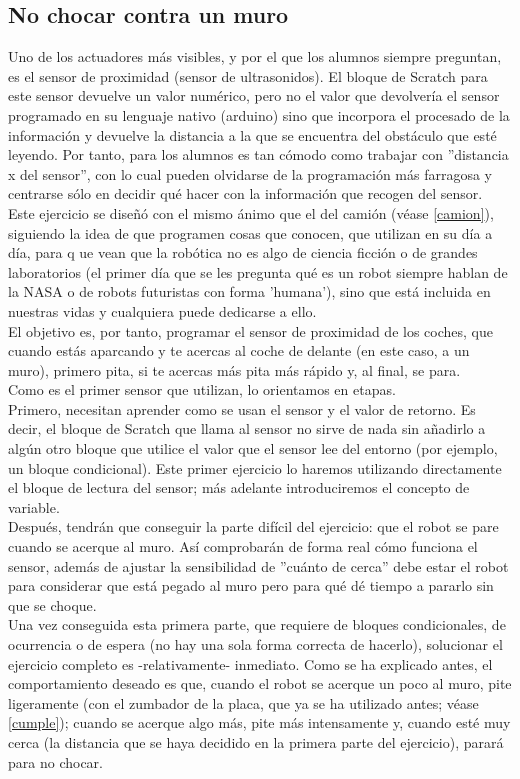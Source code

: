 \subsection{No chocar contra un muro}\label{muro}
Uno de los actuadores más visibles, y por el que los alumnos siempre preguntan, es el sensor de proximidad (sensor de ultrasonidos). El bloque de Scratch para este sensor devuelve un valor numérico, pero no el valor que devolvería el sensor programado en su lenguaje nativo (arduino) sino que incorpora el procesado de la información y devuelve la distancia a la que se encuentra del obstáculo que esté leyendo. Por tanto, para los alumnos es tan cómodo como trabajar con ''distancia x del sensor'', con lo cual pueden olvidarse de la programación más farragosa y centrarse sólo en decidir qué hacer con la información que recogen del sensor. \\
Este ejercicio se diseñó con el mismo ánimo que el del camión (véase \ref{camion}), siguiendo la idea de que programen cosas que conocen, que utilizan en su día a día, para q	ue vean que la robótica no es algo de ciencia ficción o de grandes laboratorios (el primer día que se les pregunta qué es un robot siempre hablan de la NASA o de robots futuristas con forma 'humana'), sino que está incluida en nuestras vidas y cualquiera puede dedicarse a ello.\\
El objetivo es, por tanto, programar el sensor de proximidad de los coches, que cuando estás aparcando y te acercas al coche de delante (en este caso, a un muro), primero pita, si te acercas más pita más rápido y, al final, se para. \\
Como es el primer sensor que utilizan, lo orientamos en etapas. \\
Primero, necesitan aprender como se usan el sensor y el valor de retorno. Es decir, el bloque de Scratch que llama al sensor no sirve de nada sin añadirlo a algún otro bloque que utilice el valor que el sensor lee del entorno (por ejemplo, un bloque condicional). Este primer ejercicio lo haremos utilizando directamente el bloque de lectura del sensor; más adelante introduciremos el concepto de variable.\\
Después, tendrán que conseguir la parte difícil del ejercicio: que el robot se pare cuando se acerque al muro. Así comprobarán de forma real cómo funciona el sensor, además de ajustar la sensibilidad de ''cuánto de cerca'' debe estar el robot para considerar que está pegado al muro pero para qué dé tiempo a pararlo sin que se choque.\\
Una vez conseguida esta primera parte, que requiere de bloques condicionales, de ocurrencia o de espera (no hay una sola forma correcta de hacerlo), solucionar el ejercicio completo es -relativamente- inmediato. Como se ha explicado antes, el comportamiento deseado es que, cuando el robot se acerque un poco al muro, pite ligeramente (con el zumbador de la placa, que ya se ha utilizado antes; véase \ref{cumple}); cuando se acerque algo más, pite más intensamente y, cuando esté muy cerca (la distancia que se haya decidido en la primera parte del ejercicio), parará para no chocar.

